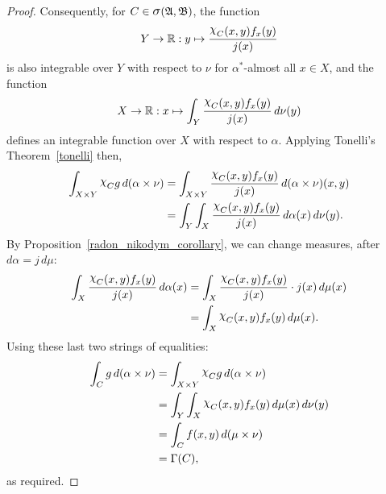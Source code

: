 \documentclass[
twoside=true,
paper=letter,
fontsize=9pt,
pagesize=auto,
leqno,
openany,
headsepline,
overfullrule,
]{scrbook}
\theoremstyle{plain}
\theoremstyle{plain}
\theoremstyle{definition}
\theoremstyle{bfnoteitalic}
\theoremstyle{bfnoteroman}
\newcommand{\sigalg}[1]{\mathfrak{#1}}
\newcommand{\sagb}{\mathop{\hbox{\large{$\sigma$}}}\nolimits}
\newcommand{\charfunction}[1]{{\raisebox{2pt}{$\chi$}}_{#1}}
\newcommand{\R}{\mathbb{R}}
\newcommand{\sigmaalgebra}{\sigalg{A}}
\newcommand{\sigmaalgebraii}{\sigalg{B}}
\newcommand{\productsig}[2]{\sagb(#1,#2)}
\newcommand{\funcj}{j}
\newcommand{\function}{f}
\newcommand{\functionii}{g}
\newcommand{\measurespace}{X}
\newcommand{\measurespaceii}{Y}
\newcommand{\mspaceelt}{x}
\newcommand{\mspaceeltii}{y}
\newcommand{\measure}{\mu}
\newcommand{\measureii}{\nu}
\newcommand{\setiii}{C}
\newcommand{\measonprod}{\Gamma}%
\newcommand{\marginalone}{\alpha}%
\begin{document}
\begin{proof}
Consequently, for $\setiii\in\productsig{\sigmaalgebra}{\sigmaalgebraii}$, 
the function
\[
\measurespaceii\to\R :
\mspaceeltii \mapsto
\frac{\charfunction{\setiii}(\mspaceelt,\mspaceeltii)
\function_\mspaceelt(\mspaceeltii)}
{\funcj(\mspaceelt)}
\]
is also integrable over $\measurespaceii$ with respect to $\measureii$ for 
$\marginalone^*$-almost all $\mspaceelt\in\measurespace$,
and the function
\[
\measurespace\to\R :
\mspaceelt \mapsto 
\int_\measurespaceii 
\frac{
\charfunction{\setiii}(\mspaceelt,\mspaceeltii) 
\function_\mspaceelt(\mspaceeltii)}{\funcj(\mspaceelt)} 
\, d\measureii(\mspaceeltii)
\]
defines an integrable function over $\measurespace$ with respect to 
$\marginalone$.
Applying Tonelli's Theorem~\ref{tonelli} then,
\begin{align*}
\int_{\measurespace\times\measurespaceii}
\charfunction{\setiii}
\functionii
\, d(\marginalone\times\measureii)
& =
\int_{\measurespace\times\measurespaceii}
\frac{
\charfunction{\setiii}(\mspaceelt,\mspaceeltii) 
\function_\mspaceelt(\mspaceeltii)}
{\funcj(\mspaceelt)} 
\, d(\marginalone\times\measureii)(\mspaceelt,\mspaceeltii)
\\
& =
\int_\measurespaceii
\int_\measurespace 
\frac{
\charfunction{\setiii}(\mspaceelt,\mspaceeltii) 
\function_\mspaceelt(\mspaceeltii)}{\funcj(\mspaceelt)} 
\, d\marginalone(\mspaceelt)
\, d\measureii(\mspaceeltii).
\end{align*}
By Proposition~\ref{radon_nikodym_corollary}, we can change measures, after
$d\marginalone = \funcj \, d\measure$:
\begin{align*}
\int_\measurespace 
\frac{
\charfunction{\setiii}(\mspaceelt,\mspaceeltii) 
\function_\mspaceelt(\mspaceeltii)}{\funcj(\mspaceelt)} 
\, d\marginalone(\mspaceelt)
& =
\int_\measurespace 
\frac{
\charfunction{\setiii}(\mspaceelt,\mspaceeltii) 
\function_\mspaceelt(\mspaceeltii)}{\funcj(\mspaceelt)} 
\cdot \funcj(\mspaceelt)
\, d\measure(\mspaceelt)
\\
& =
\int_\measurespace 
\charfunction{\setiii}(\mspaceelt,\mspaceeltii) 
\function_\mspaceelt(\mspaceeltii)
\, d\measure(\mspaceelt).
\end{align*}
Using these last two strings of equalities:
\begin{align*}
\int_\setiii \functionii
\,d(\marginalone\times\measureii)
& = 
\int_{\measurespace\times\measurespaceii}
\charfunction{\setiii}
\functionii
\, d(\marginalone\times\measureii)
\\
& =
\int_\measurespaceii
\int_\measurespace 
\charfunction{\setiii}(\mspaceelt,\mspaceeltii) 
\function_\mspaceelt(\mspaceeltii)
\, d\measure(\mspaceelt)
\, d\measureii(\mspaceeltii)
\\
& =
\int_{\setiii} 
\function(\mspaceelt,\mspaceeltii)
\, d(\measure\times\measureii)
\\
& =
\measonprod(\setiii),
\end{align*}
as required.


\end{proof}
\end{document}
